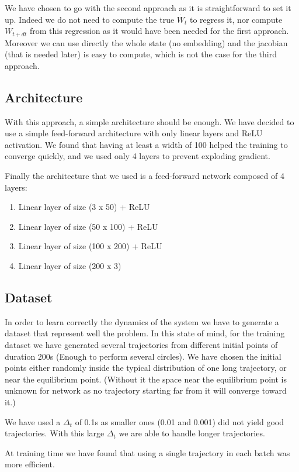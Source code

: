 \documentclass{article}
\begin{document}
We have chosen to go with the second approach as it is straightforward to set it up. Indeed we do not need to compute the true $\dot{W_t}$ to regress it,
nor compute $W_{t + dt}$ from this regression as it would have been needed for the first approach. Moreover we can use directly the whole state
(no embedding) and the jacobian (that is needed later) is easy to compute, which is not the case for the third approach.

\subsection{Architecture}
With this approach, a simple architecture should be enough. We have decided to use a simple feed-forward architecture with only linear layers and
ReLU activation. We found that having at least a width of 100 helped the training to converge quickly, and we used only 4 layers to prevent exploding
gradient.

Finally the architecture that we used is a feed-forward network composed of 4 layers:
\begin{enumerate}
    \item Linear layer of size (3 x 50) + ReLU
    \item Linear layer of size (50 x 100) + ReLU
    \item Linear layer of size (100 x 200) + ReLU
    \item Linear layer of size (200 x 3)
\end{enumerate}

\subsection{Dataset}
In order to learn correctly the dynamics of the system we have to generate a dataset that represent well the problem. In this state of mind, for
the training dataset we have generated several trajectories from different initial points of duration 200s (Enough to perform several circles).
We have chosen the initial points either randomly inside the typical distribution of one long trajectory, or near the equilibrium point.
(Without it the space near the equilibrium point is unknown for network as no trajectory starting far from it will converge toward it.)

We have used a $\Delta_t$ of 0.1s as smaller ones (0.01 and 0.001) did not yield good trajectories. With this large $\Delta_t$ we are able to
handle longer trajectories.

At training time we have found that using a single trajectory in each batch was more efficient.
\end{document}
